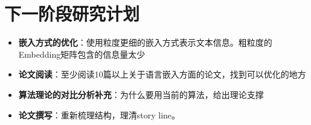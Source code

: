 
\chapter{下一阶段研究计划}

\begin{itemize}
    \item \textbf{嵌入方式的优化}：使用粒度更细的嵌入方式表示文本信息。粗粒度的Embedding矩阵包含的信息量太少
    \item \textbf{论文阅读}：至少阅读10篇以上关于语言嵌入方面的论文，找到可以优化的地方
    \item \textbf{算法理论的对比分析补充}：为什么要用当前的算法，给出理论支撑
    \item \textbf{论文撰写}：重新梳理结构，理清story line。
\end{itemize}